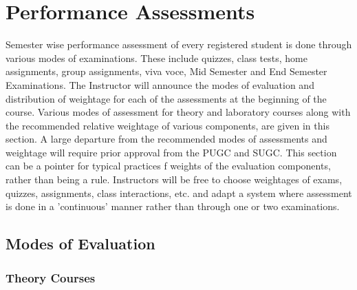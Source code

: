 \section{Performance Assessments}

Semester wise performance assessment of every registered student is done through various modes of examinations. These include quizzes, class tests, home assignments, group assignments, viva voce, Mid Semester and End Semester Examinations. The Instructor will announce the modes of evaluation and distribution of weightage for each of the assessments at the beginning of the course. Various modes of assessment for theory and laboratory courses along with the recommended relative weightage of various components, are given in this section. A large departure from the recommended modes of assessments and weightage will require prior approval from the PUGC and SUGC. This section can be a pointer for typical practices f weights of the evaluation components, rather than being a rule. Instructors will be free to choose weightages of exams, quizzes, assignments, class interactions, etc. and adapt a system where assessment is done in a 'continuous' manner rather than through one or two examinations.

\subsection{Modes of Evaluation}

\subsubsection{Theory Courses}

